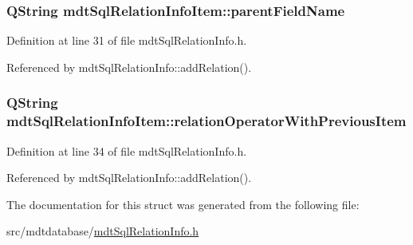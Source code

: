 \hypertarget{structmdt_sql_relation_info_item_a2ab8ed9e084a85cc0303b7d983f5e270}{
\subsubsection[{parent\-Field\-Name}]{\setlength{\rightskip}{0pt plus 5cm}Q\-String mdt\-Sql\-Relation\-Info\-Item\-::parent\-Field\-Name}}\label{structmdt_sql_relation_info_item_a2ab8ed9e084a85cc0303b7d983f5e270}


Definition at line 31 of file mdt\-Sql\-Relation\-Info.\-h.



Referenced by mdt\-Sql\-Relation\-Info\-::add\-Relation().

\hypertarget{structmdt_sql_relation_info_item_a30754ae8014357e546d00698d1d79d32}{
\subsubsection[{relation\-Operator\-With\-Previous\-Item}]{\setlength{\rightskip}{0pt plus 5cm}Q\-String mdt\-Sql\-Relation\-Info\-Item\-::relation\-Operator\-With\-Previous\-Item}}\label{structmdt_sql_relation_info_item_a30754ae8014357e546d00698d1d79d32}


Definition at line 34 of file mdt\-Sql\-Relation\-Info.\-h.



Referenced by mdt\-Sql\-Relation\-Info\-::add\-Relation().



The documentation for this struct was generated from the following file\-:\begin{DoxyCompactItemize}
\item 
src/mdtdatabase/\hyperlink{mdt_sql_relation_info_8h}{mdt\-Sql\-Relation\-Info.\-h}\end{DoxyCompactItemize}
